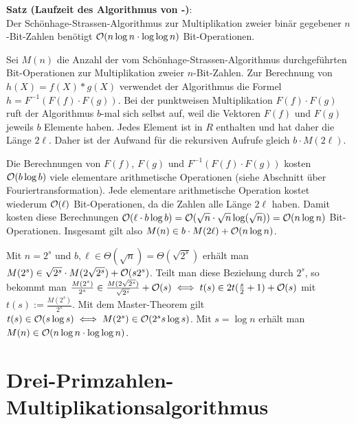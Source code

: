 \linie

\textbf{Satz (Laufzeit des Algorithmus von -)}:\\
Der Schönhage-Strassen-Algorithmus zur Multiplikation zweier binär gegebener $n$-Bit-Zahlen
benötigt $\mathcal{O}(n \log n \cdot \log \log n)$ Bit-Operationen.

\begin{Beweis}
    Sei $M(n)$ die Anzahl der vom Schönhage-Strassen-Algorithmus durchgeführten
    Bit-Operationen zur Multiplikation zweier $n$-Bit-Zahlen.
    Zur Berechnung von $h(X) = f(X) \ast g(X)$ verwendet der Algorithmus die Formel
    $h = F^{-1}(F(f) \cdot F(g))$.
    Bei der punktweisen Multiplikation $F(f) \cdot F(g)$ ruft der Algorithmus $b$-mal sich selbst
    auf, weil die Vektoren $F(f)$ und $F(g)$ jeweils $b$ Elemente haben.
    Jedes Element ist in $R$ enthalten und hat daher die Länge $2\ell$.
    Daher ist der Aufwand für die rekursiven Aufrufe gleich $b \cdot M(2\ell)$.

    Die Berechnungen von $F(f)$, $F(g)$ und $F^{-1}(F(f) \cdot F(g))$ kosten
    $\mathcal{O}(b \log b)$ viele elementare arithmetische Operationen
    (siehe Abschnitt über Fouriertransformation).
    Jede elementare arithmetische Operation kostet wiederum $\mathcal{O}(\ell)$ Bit-Operationen,
    da die Zahlen alle Länge $2\ell$ haben.
    Damit kosten diese Berechnungen
    $\mathcal{O}(\ell \cdot b \log b) = \mathcal{O}(\sqrt{n} \cdot \sqrt{n} \log(\sqrt{n})) = \mathcal{O}(n \log n)$
    Bit-Operationen.
    Insgesamt gilt also $M(n) \in b \cdot M(2\ell) + \mathcal{O}(n \log n)$.

    Mit $n = 2^s$ und $b, \ell \in \Theta(\sqrt{n}) = \Theta(\sqrt{2^s})$ erhält man
    $M(2^s) \in \sqrt{2^s} \cdot M(2\sqrt{2^s}) + \mathcal{O}(s 2^s)$.
    Teilt man diese Beziehung durch $2^s$, so bekommt man
    $\frac{M(2^s)}{2^s} \in \frac{M(2\sqrt{2^s})}{\sqrt{2^s}} + \mathcal{O}(s)
    \iff t(s) \in 2t(\frac{s}{2} + 1) + \mathcal{O}(s)$
    mit $t(s) := \frac{M(2^s)}{2^s}$.
    Mit dem Master-Theorem gilt $t(s) \in \mathcal{O}(s \log s) \iff M(2^s) \in \mathcal{O}(2^s s \log s)$.
    Mit $s = \log n$ erhält man $M(n) \in \mathcal{O}(n \log n \cdot \log \log n)$.
\end{Beweis}

\pagebreak

\section{%
    Drei-Primzahlen-Multiplikationsalgorithmus%
}

